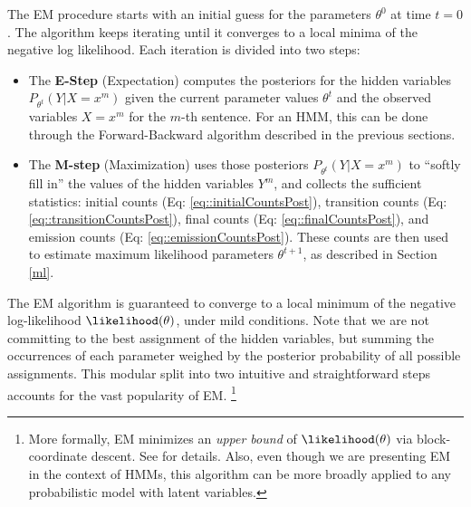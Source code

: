 The EM procedure starts with an initial guess for the parameters
$\theta^0$ at time $t = 0$. The algorithm keeps iterating 
until it converges to a local minima of the negative log likelihood. Each
iteration is divided into two steps:
\begin{itemize} 
 \item The {\bf{E-Step}} (Expectation) 
computes the posteriors for the hidden variables $P_{\theta^t}(Y|X=x^m)$
given the current parameter values $\theta^t$ and the observed variables $X=x^m$ for the $m$-th sentence. 
For an HMM, this can be done through the Forward-Backward algorithm described in the previous sections.
\item The {\bf{M-step}} (Maximization) uses those posteriors $P_{\theta^t}(Y|X=x^m)$ to
``softly fill in'' the values of the hidden variables $Y^m$, and
collects the sufficient statistics: initial counts (Eq: \ref{eq::initialCountsPost}), transition counts (Eq:
\ref{eq::transitionCountsPost}), 
final counts  (Eq: \ref{eq::finalCountsPost}),
and emission counts (Eq: \ref{eq::emissionCountsPost}). These
counts are then used to estimate maximum likelihood parameters $\theta^{t+1}$, as described in
Section \ref{ml}.
\end{itemize}

The EM algorithm is guaranteed to
converge to a local minimum of the negative log-likelihood $\likelihood(\theta)$, under mild
conditions.  
Note that we are not committing to the best assignment of the hidden variables, but
summing the occurrences of each parameter weighed by the posterior
probability of all possible assignments. 
This modular split into two intuitive and straightforward steps
accounts for the vast popularity of EM.%
\footnote{More formally, EM minimizes an \emph{upper bound} of $\likelihood(\theta)$ via block-coordinate descent. See \citet{Neal1998} for details. Also, even though we are presenting EM in the context of HMMs, this algorithm can be more broadly applied to any probabilistic model with latent variables.} %


